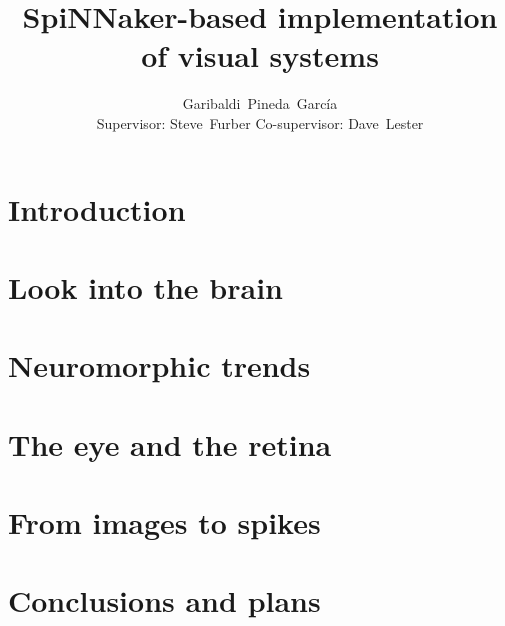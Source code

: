 \documentclass[11pt,a4paper]{book}
\title{SpiNNaker-based implementation of visual systems}
\author{Garibaldi~Pineda~García \\ Supervisor: Steve~Furber Co-supervisor: Dave~Lester}
\date{}
\begin{document}
  \thispagestyle{empty}
  



  \cleardoublepage
  \tableofcontents
  \cleardoublepage


  
  \chapter{Introduction}
  
  \chapter{Look into the brain}
  
  \chapter{Neuromorphic trends}
  
  \chapter{The eye and the retina}
  
  \chapter{From images to spikes}
  
  \chapter{Conclusions and plans}
  
  
  
  
\end{document}
